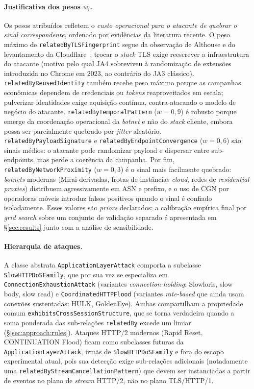 \documentclass[preprint,12pt]{elsarticle}
\begin{document}
\paragraph{Justificativa dos pesos \(w_i\).} Os pesos atribuídos refletem o \emph{custo operacional para o atacante de quebrar o sinal correspondente}, ordenado por evidências da literatura recente. O peso máximo de \texttt{relatedByTLSFingerprint} segue da observação de Althouse e do levantamento da Cloudflare~\cite{cloudflare2023rapidreset,cloudflare2025q2ddos}: trocar o \emph{stack} TLS exige reescrever a infraestrutura do atacante (motivo pelo qual JA4 sobreviveu à randomização de extensões introduzida no Chrome em 2023, ao contrário do JA3 clássico). \texttt{relatedByReusedIdentity} também recebe peso máximo porque as campanhas econômicas dependem de credenciais ou \emph{tokens} reaproveitados em escala; pulverizar identidades exige aquisição contínua, contra-atacando o modelo de negócio do atacante. \texttt{relatedByTemporalPattern} (\(w = 0{,}9\)) é robusto porque emerge da coordenação operacional da \emph{botnet} e não do \emph{stack} cliente, embora possa ser parcialmente quebrado por \emph{jitter} aleatório. \texttt{relatedByPayloadSignature} e \texttt{relatedByEndpointConvergence} (\(w = 0{,}6\)) são sinais médios: o atacante pode randomizar payload e dispersar entre sub-endpoints, mas perde a coerência da campanha. Por fim, \texttt{relatedByNetworkProximity} (\(w = 0{,}3\)) é o sinal mais facilmente quebrado: \emph{botnets} modernas (Mirai-derivadas, frotas de instâncias \emph{cloud}, redes de \emph{residential proxies}) distribuem agressivamente em ASN e prefixo, e o uso de CGN por operadoras móveis introduz falsos positivos quando o sinal é confiado isoladamente. Esses valores são \emph{priors} declarados; a calibração empírica final por \emph{grid search} sobre um conjunto de validação separado é apresentada em §\ref{sec:results} junto com a análise de sensibilidade.

\paragraph{Hierarquia de ataques.} A classe abstrata \texttt{ApplicationLayerAttack} comporta a subclasse \texttt{SlowHTTPDoSFamily}, que por sua vez se especializa em \texttt{ConnectionExhaustionAttack} (variantes \emph{connection-holding}: Slowloris, slow body, slow read) e \texttt{CoordinatedHTTPFlood} (variantes \emph{rate-based} que ainda usam conexões sustentadas: HULK, GoldenEye). Ambas compartilham a propriedade comum \texttt{exhibitsCrossSessionStructure}, que se torna verdadeira quando a soma ponderada das sub-relações \texttt{relatedBy} excede um limiar (§\ref{sec:approach:rules}). Ataques HTTP/2 modernos (Rapid Reset, CONTINUATION Flood) ficam como subclasses futuras da \texttt{ApplicationLayerAttack}, irmãs de \texttt{SlowHTTPDoSFamily} e fora do escopo experimental atual, pois sua detecção exige sub-relações adicionais (notadamente uma \texttt{relatedByStreamCancellationPattern}) que devem ser instanciadas a partir de eventos no plano de \emph{stream} HTTP/2, não no plano TLS/HTTP/1.
\end{document}
